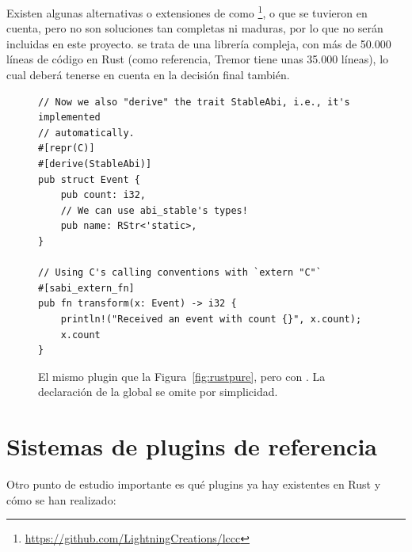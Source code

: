 Existen algunas alternativas o extensiones de \abistable como
\footnote{\url{https://github.com/LightningCreations/lccc}},
 o  que se tuvieron en cuenta, pero no son
soluciones tan completas ni maduras, por lo que no serán incluidas en este
proyecto. \abistable se trata de una librería compleja, con más de 50.000 líneas
de código en Rust (como referencia, Tremor tiene unas 35.000 líneas), lo cual
deberá tenerse en cuenta en la decisión final también.

\begin{figure}
    \centering
    \begin{verbatim}
// Now we also "derive" the trait StableAbi, i.e., it's implemented
// automatically.
#[repr(C)]
#[derive(StableAbi)]
pub struct Event {
    pub count: i32,
    // We can use abi_stable's types!
    pub name: RStr<'static>,
}

// Using C's calling conventions with `extern "C"`
#[sabi_extern_fn]
pub fn transform(x: Event) -> i32 {
    println!("Received an event with count {}", x.count);
    x.count
}
    \end{verbatim}

    \caption{El mismo plugin que la Figura~\ref{fig:rustpure}, pero con
        \abistable. La declaración de la global  se omite por
        simplicidad.}%
    \label{fig:rustabi_stable}
\end{figure}

\section{Sistemas de plugins de referencia}

Otro punto de estudio importante es qué plugins ya hay existentes en Rust y cómo
se han realizado:

